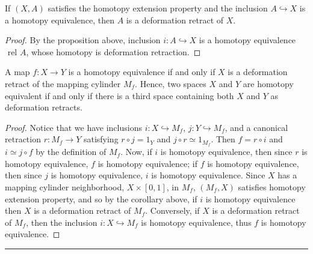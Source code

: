 \begin{cor} If $(X,A)$ satisfies the homotopy extension property and the inclusion $A\hookrightarrow X$ is a homotopy equivalence, then $A$ is a deformation retract of $X$.
\end{cor}
\begin{proof}
By the proposition above, inclusion $i:A\hookrightarrow X$ is a homotopy equivalence $\textrm{ rel } A$, whose homotopy is deformation retraction.
\end{proof}

\begin{cor} A map $f:X\rightarrow Y$ is a homotopy equivalence if and only if $X$ is a deformation retract of the mapping cylinder $M_f$. Hence, two spaces $X$ and $Y$ are homotopy equivalent if and only if there is a third space containing both $X$ and $Y$ as deformation retracts.
\end{cor}
\begin{proof}
Notice that we have inclusions $i:X\hookrightarrow M_f$, $j:Y\hookrightarrow M_f$, and a canonical retraction $r:M_f\rightarrow Y$ satisfying $r\circ j=1_Y$ and $j\circ r\simeq 1_{M_f}$. Then $f=r\circ i$ and $i\simeq j\circ f$ by the definition of $M_f$. Now, if $i$ is homotopy equivalence, then since $r$ is homotopy equivalence, $f$ is homotopy equivalence; if $f$ is homotopy equivalence, then since $j$ is homotopy equivalence, $i$ is homotopy equivalence. Since $X$ has a mapping cylinder neighborhood, $X\times[0,1]$, in $M_f$, $(M_f,X)$ satisfies homotopy extension property, and so by the corollary above, if $i$ is homotopy equivalence then $X$ is a deformation retract of $M_f$. Conversely, if $X$ is a deformation retract of $M_f$, then the inclusion $i:X\hookrightarrow M_f$ is homotopy equivalence, thus $f$ is homotopy equivalence.
\end{proof}

\noindent\rule{\textwidth}{1pt}
\newline